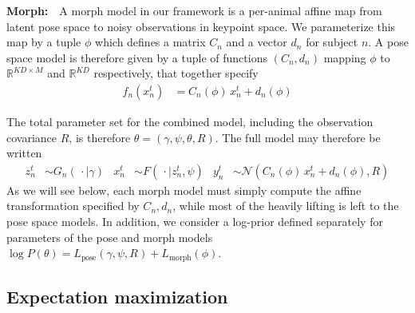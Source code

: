 \documentclass{article}         %
\newcommand{\RR}{\mathbb{R}}
\newcommand{\NN}{\mathcal{N}}
\begin{document}
\textbf{Morph:}\ \ A morph model in our framework is a per-animal affine map from latent pose space to noisy observations in keypoint space. We parameterize this map by a tuple $\phi$ which defines a matrix $C_n$ and a vector $d_n$ for subject $n$. A pose space model is therefore given by a tuple of functions $(C_n, d_n)$ mapping $\phi$ to $\RR^{KD\times M}$ and $\RR^{KD}$ respectively, that together specify
\begin{align}
    f_n(x_n^t) &= C_n(\phi)\, x_n^t + d_n(\phi)
\end{align}

The total parameter set for the combined model, including the observation covariance $R$, is therefore $\theta = (\gamma, \psi, \theta, R)$. The full model may therefore be written
\begin{align}
    z^t_n &\sim G_n(\,\cdot \mid \gamma) &
    x^t_n &\sim F(\,\cdot \mid z^t_n, \psi) &
    y^t_n &\sim \NN(C_n(\phi)\, x_n^t + d_n(\phi), R)
    \label{eq:gen-model}
\end{align}
As we will see below, each morph model must simply compute the affine transformation specified by $C_n, d_n$, while most of the heavily lifting is left to the pose space models. In addition, we consider a log-prior defined separately for parameters of the pose and morph models $\log P(\theta) = L_{\text{pose}}(\gamma, \psi, R) + L_{\text{morph}}(\phi)$.


\subsection{Expectation maximization}
\label{sec:em-general}
\end{document}
